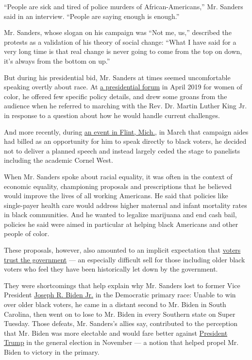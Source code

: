 ``People are sick and tired of police murders of African-Americans,''
Mr. Sanders said in an interview. ``People are saying enough is
enough.''

Mr. Sanders, whose slogan on his campaign was ``Not me, us,'' described
the protests as a validation of his theory of social change: ``What I
have said for a very long time is that real change is never going to
come from the top on down, it's always from the bottom on up.''

But during his presidential bid, Mr. Sanders at times seemed
uncomfortable speaking overtly about race. At
\href{https://www.nytimes3xbfgragh.onion/2019/04/24/us/politics/she-the-people-forum-2020-women.html}{a
presidential forum} in April 2019 for women of color, he offered few
specific policy details, and drew some groans from the audience when he
referred to marching with the Rev. Dr. Martin Luther King Jr. in
response to a question about how he would handle current challenges.

And more recently, during
\href{https://www.nytimes3xbfgragh.onion/2020/03/08/us/politics/bernie-sanders-michigan.html}{an
event in Flint, Mich.}, in March that campaign aides had billed as an
opportunity for him to speak directly to black voters, he decided not to
deliver a planned speech and instead largely ceded the stage to
panelists including the academic Cornel West.

When Mr. Sanders spoke about racial equality, it was often in the
context of economic equality, championing proposals and prescriptions
that he believed would improve the lives of all working Americans. He
said that policies like single-payer health care would address higher
maternal and infant mortality rates in black communities. And he wanted
to legalize marijuana and end cash bail, policies he said were aimed in
particular at helping black Americans and other people of color.

These proposals, however, also amounted to an implicit expectation that
\href{https://www.nytimes3xbfgragh.onion/2020/01/19/us/politics/bernie-sanders-black-vote-elizabeth-warren.html}{voters
trust the government} --- an especially difficult sell for those
including older black voters who feel they have been historically let
down by the government.

They were shortcomings that help explain why Mr. Sanders lost to former
Vice President
\href{https://www.nytimes3xbfgragh.onion/interactive/2020/us/elections/joe-biden.html}{Joseph
R. Biden Jr.} in the Democratic primary race: Unable to win over older
black voters, he came in a distant second to Mr. Biden in South
Carolina, then went on to lose to Mr. Biden in every Southern state on
Super Tuesday. Those defeats, Mr. Sanders's allies say, contributed to
the perception that Mr. Biden was more electable and would fare better
against
\href{https://www.nytimes3xbfgragh.onion/interactive/2020/us/elections/donald-trump.html}{President
Trump} in the general election in November --- a notion that helped
propel Mr. Biden to victory in the primary.


